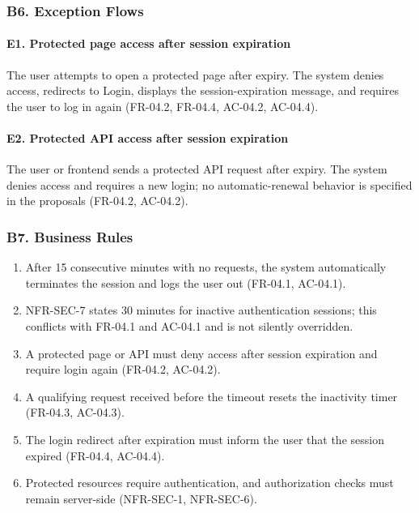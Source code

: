 \documentclass[12pt]{article}
\begin{document}
\hypertarget{sec:b6-exception-flows}{}
\subsubsection*{B6. Exception Flows}
\par\medskip

\hypertarget{sec:e1-protected-page-access-after-session-expiration}{}
\paragraph*{E1. Protected page access after session expiration}
\par\medskip

The user attempts to open a protected page after expiry. The system denies access, redirects to Login, displays the session-expiration message, and requires the user to log in again (FR-04.2, FR-04.4, AC-04.2, AC-04.4).
\par\medskip

\hypertarget{sec:e2-protected-api-access-after-session-expiration}{}
\paragraph*{E2. Protected API access after session expiration}
\par\medskip

The user or frontend sends a protected API request after expiry. The system denies access and requires a new login; no automatic-renewal behavior is specified in the proposals (FR-04.2, AC-04.2).
\par\medskip

\hypertarget{sec:b7-business-rules}{}
\subsubsection*{B7. Business Rules}
\par\medskip

\begin{enumerate}
\item After 15 consecutive minutes with no requests, the system automatically terminates the session and logs the user out (FR-04.1, AC-04.1).
\item NFR-SEC-7 states 30 minutes for inactive authentication sessions; this conflicts with FR-04.1 and AC-04.1 and is not silently overridden.
\item A protected page or API must deny access after session expiration and require login again (FR-04.2, AC-04.2).
\item A qualifying request received before the timeout resets the inactivity timer (FR-04.3, AC-04.3).
\item The login redirect after expiration must inform the user that the session expired (FR-04.4, AC-04.4).
\item Protected resources require authentication, and authorization checks must remain server-side (NFR-SEC-1, NFR-SEC-6).
\end{enumerate}
\par\medskip
\end{document}
